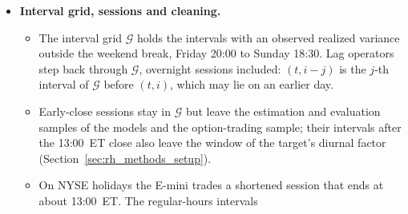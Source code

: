 \begin{itemize}
\begin{itemize}
    realized moments of the constituents' 5-minute returns.
  \item \textbf{Sentiment} (\bkSizeSent{} series): StockTwits attention (posts in the half hour), the sentiment score of
    the posts tagged bullish or bearish, and their number.
  \item \textbf{Implied volatility} (\bkSizeIv{} series): the Cboe VIX, VIX3M and VVIX indices.
  \item \textbf{Volatility demand} (\bkSizeVd{} series): the net vega bought by customers other than market makers in
    Cboe option volume.
  \item \textbf{FOMC} (\bkSizeFomc{} series): an indicator for a scheduled Federal Open Market Committee statement on
    day $t$ and the proximity measures $1/(1+n^{+}_{t,i})$ and $1/(1+n^{-}_{t,i})$, with $n^{+}_{t,i}$ and
    $n^{-}_{t,i}$ the number of intervals until the next and since the last scheduled statement. The proximity
    measures follow the pre-announced meeting calendar, so all three series are known before the interval begins;
    the meeting scheduled for \rhdsFomcSchedMeeting{} is the next statement until the action announced on
    \rhdsFomcReplaced{} replaced it (Appendix~\ref{app:rh_dp_fomc}).
  \end{itemize}
  Our data end on \rhdsSampleEnd. The file of the implied volatility indices ends on \rhdsVixVendorLast{} and is
  extended with the hourly closes of a free feed; the FOMC release file ends with the statement of \rhdsFomcFileLast{}
  and is completed with the \rhdsFomcAdded{} scheduled statements that follow; the volatility-demand feed ends on
  \rhdsVdLast{} (Appendix~\ref{app:rh_dp_sources}).
\item \textbf{Interval grid, sessions and cleaning.}
  \begin{itemize}
  \item The interval grid $\mathcal{G}$ holds the intervals with an observed realized variance outside the weekend
    break, Friday 20:00 to Sunday 18:30. Lag operators step back through $\mathcal{G}$, overnight sessions included:
    $(t, i - j)$ is the $j$-th interval of $\mathcal{G}$ before $(t, i)$, which may lie on an earlier day.
  \item Early-close sessions stay in $\mathcal{G}$ but leave the estimation and evaluation samples of the
    models and the option-trading sample; their intervals after the 13:00~ET close also leave the window of the
    target's diurnal factor (Section~\ref{sec:rh_methods_setup}).
  \item On NYSE holidays the E-mini trades a shortened session that ends at about 13:00~ET. The regular-hours intervals

\end{itemize}
\end{itemize}
